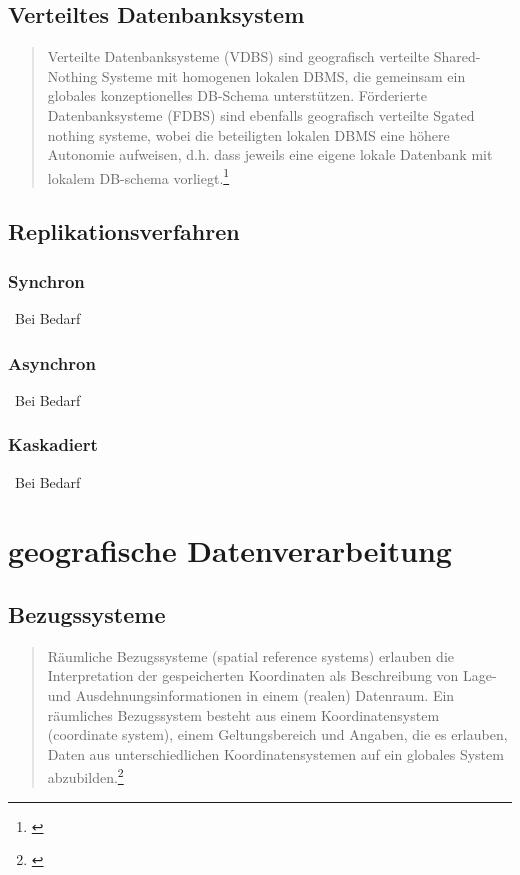 \subsection{Verteiltes Datenbanksystem}

\begin{quote}
Verteilte Datenbanksysteme (VDBS) sind geografisch verteilte Shared-Nothing Systeme mit homogenen lokalen DBMS, die gemeinsam ein globales konzeptionelles DB-Schema unterstützen.
Förderierte Datenbanksysteme (FDBS) sind ebenfalls geografisch verteilte Sgated nothing systeme, wobei die beteiligten lokalen DBMS eine höhere Autonomie aufweisen, d.h. dass jeweils eine eigene lokale Datenbank mit lokalem DB-schema vorliegt.\footnote{\cite[S.398]{book:kudrass}}
\end{quote}

\subsection{Replikationsverfahren}

\subsubsection{Synchron}\
Bei Bedarf

\subsubsection{Asynchron}\
Bei Bedarf

\subsubsection{Kaskadiert}\
Bei Bedarf

\newpage

\section{geografische Datenverarbeitung}

\subsection{Bezugssysteme}

\begin{quote}
Räumliche Bezugssysteme (spatial reference systems) erlauben die Interpretation der gespeicherten Koordinaten als Beschreibung von Lage- und Ausdehnungsinformationen in einem (realen) Datenraum. Ein räumliches Bezugssystem besteht aus einem Koordinatensystem (coordinate system), einem Geltungsbereich und Angaben, die es erlauben, Daten aus unterschiedlichen Koordinatensystemen auf ein globales System abzubilden.\footnote{\cite[S.506]{book:kudrass}}
\end{quote}

